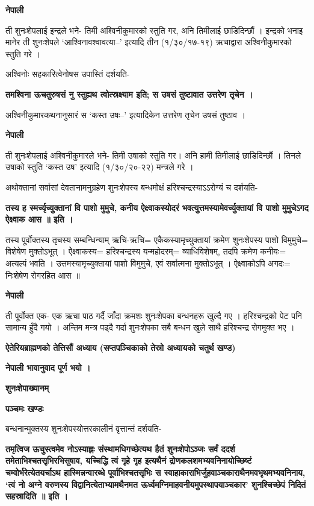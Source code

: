 \documentclass[11pt, a5paper]{article}
\begin{document}
\textbf{नेपाली}

ती शुनःशेपलाई इन्द्रले भने- तिमी अश्विनीकुमारको स्तुति गर, अनि तिमीलाई छाडिदिन्छौं । इन्द्रको भनाइ मानेर ती शुनःशेपले ‘आश्विनावश्वावत्या--’ इत्यादि तीन (१/३०/१७-१९) ऋचाद्वारा अश्विनीकुमारको स्तुति गरे ।

अश्विनोः सहकारित्वेनोषस उपास्तिं दर्शयति-

\textbf{तमश्विना ऊचतुरुषसं नु स्तुह्यथ त्वोत्स्रक्ष्याम इति; स उषसं तुष्टावात उत्तरेण तृचेन ।}

अश्विनीकुमारकथनानुसारं स ‘कस्त उषः--’ इत्यादिकेन उत्तरेण तृचेन उषसं तुष्ठाव ।

\textbf{नेपाली}

ती शुनःशेपलाई अश्विनीकुमारले भने- तिमी उषाको स्तुति गर। अनि हामी तिमीलाई छाडिदिन्छौं । तिनले उषाको स्तुति ‘कस्त उष’ इत्यादि (१/३०/२०-२२) मन्त्रले गरे ।

अथोक्तानां सर्वासां देवतानामनुग्रहेण शुनःशेपस्य बन्धमोक्षं हरिश्चन्द्रस्याऽऽरोग्यं च दर्शयति-

\textbf{तस्य ह स्मर्च्यृच्युक्तानां वि पाशो मुमुचे, कनीय ऐक्ष्वाकस्योदरं भवत्युत्तमस्यामेवर्च्युक्तायां वि पाशो मुमुचेऽगद ऐक्ष्वाक आस ॥ इति ।}

तस्य पूर्वोक्तस्य तृचस्य सम्बन्धिन्याम् ऋचि-ऋचि= एकैकस्यामृच्युक्तायां क्रमेण शुनःशेपस्य पाशो विमुमुचे= विशेषेण मुक्तोऽभूत् । ऐेक्ष्वाकस्य‍= हरिश्चन्द्रस्य यन्महोदरम्= व्याधिविशेषम्, तदपि क्रमेण कनीयः= अत्यल्पं भवति । उत्तमस्यामृच्युक्तायां पाशो विमुमुचे, एवं सर्वात्मना मुक्तोऽभूत् । ऐक्ष्वाकोऽपि अगदः= निःशेषेण रोगरहित आस ॥

\textbf{नेपाली}

ती पूर्वोक्त एक- एक ऋचा पाठ गर्दै जाँदा क्रमशः शुनःशेपका बन्धनहरू खुल्दै गए । हरिश्चन्द्रको पेट पनि सामान्य हुँदै गयो । अन्तिम मन्त्र पढ्दै गर्दा शुनःशेपका सबै बन्धन खुले साथै हरिश्चन्द्र रोगमुक्त भए ।

\textbf{ऐतेरियब्राह्मणको  तेत्तिसौं अध्याय (सप्तपञ्चिकाको तेस्रो अध्यायको चतुर्थ खण्ड)}

\textbf{नेपाली भावानुवाद पूर्ण भयो ।}

\textbf{शुनःशेपाख्यानम्}

\textbf{पञ्चमः खण्डः}

बन्धनान्मुक्तस्य शुनःशेपस्योत्तरकालीनं वृत्तान्तं दर्शयति-

\textbf{तमृत्विज ऊचुस्त्वमेव नोऽस्याह्नः संस्थामधिगच्छेत्यथ हैतं शुनःशेपोऽञ्जः सर्वं ददर्श तमेताभिश्चतसृभिरभिसुषाव, यच्चिद्धि त्वं गृहे गृह इत्यथैनं द्रोणकलशमभ्यवनिनायोच्छिष्टं चम्वोर्भरेत्येतयर्चाऽथ हास्मिन्नन्वारब्धे पूर्वाभिश्चतसृभिः स स्वाहाकाराभिर्जुहवाञ्चकाराथैनमवभृथमभ्यवनिनाय, ‘त्वं नो अग्ने वरुणस्य विद्वानित्येताभ्यामथैनमत ऊर्ध्वमग्निमाहवनीयमुपस्थापयाञ्चकार’ शुनश्चिच्छेपं निदितं सहस्रादिति ॥ इति ।}
\end{document}
